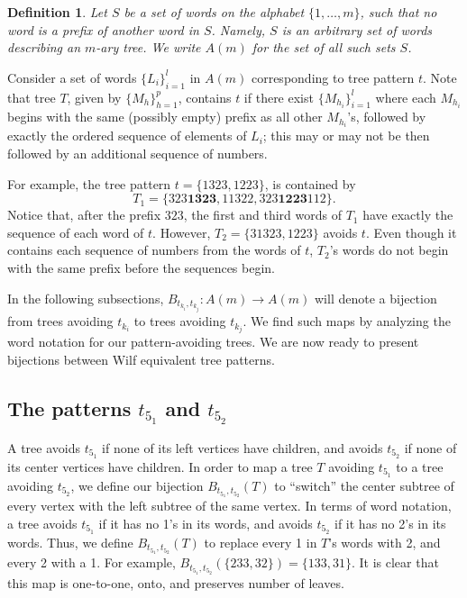 \documentclass[12pt]{article}
\newtheorem{definition}{Definition}
\begin{document}
\begin{definition}
Let \emph{$S$} be a set of words on the alphabet $\{1, \dots, m\}$, such that no word is a prefix of another word in $S$. Namely, $S$ is an arbitrary set of words describing an $m$-ary tree.  We write \emph{$A(m)$} for the set of all such sets $S$.
\end{definition}

Consider a set of words $ \{ L_i \}_{i=1}^l $ in $A(m)$ corresponding to tree pattern $t$.  Note that tree $T$, given by $ \{ M_h \}_{h=1}^p $, contains $t$ if there exist $ \{ M_{h_i} \}_{i=1}^l $ where each $M_{h_i}$ begins with the same (possibly empty) prefix as all other $M_{h_i}$'s, followed by exactly the ordered sequence of elements of $L_i$; this may or may not be then followed by an additional sequence of numbers.

For example, the tree pattern $t= \{1323, 1223\} $, is contained by $$T_1= \{ 323\mathbf{1323}, 11322, 323\mathbf{1223}112 \}. $$  Notice that, after the prefix $323$, the first and third words of $T_1$ have exactly the sequence of each word of $t$.  However, $T_2= \{ 31323, 1223 \} $ avoids $t$.  Even though it contains each sequence of numbers from the words of $t$, $T_2$'s words do not begin with the same prefix before the sequences begin.

In the following subsections, $B_{t_{k_i},t_{k_j}}:A(m) \rightarrow A(m)$ will denote a bijection from trees avoiding $t_{k_i}$ to trees avoiding $t_{k_j}$.  We find such maps by analyzing the word notation for our pattern-avoiding trees.  We are now ready to present bijections between Wilf equivalent tree patterns.

\subsection{The patterns \texorpdfstring{$t_{5_1}$}{t51} and \texorpdfstring{$t_{5_2}$}{t52}}

A tree avoids $t_{5_1}$ if none of its left vertices have children, and avoids $t_{5_2}$ if none of its center vertices have children.  In order to map a tree $T$ avoiding $t_{5_1}$ to a tree avoiding $t_{5_2}$, we define our bijection $B_{t_{5_1},t_{5_2}}(T)$ to ``switch'' the center subtree of every vertex with the left subtree of the same vertex.  In terms of word notation, a tree avoids $t_{5_1}$ if it has no 1's in its words, and avoids $t_{5_2}$ if it has no 2's in its words.  Thus, we define $B_{t_{5_1},t_{5_2}}(T)$ to replace every 1 in $T$'s words with 2, and every 2 with a 1.  For example, $B_{t_{5_1},t_{5_2}}( \{ 233, 32 \} ) = \{ 133, 31 \} $.  It is clear that this map is one-to-one, onto, and preserves number of leaves.
\end{document}
